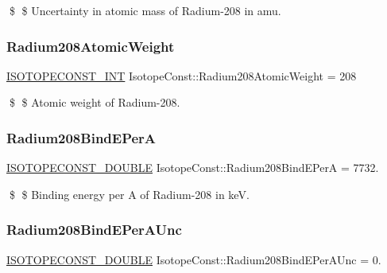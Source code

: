 \$ \$ Uncertainty in atomic mass of Radium-\/208 in amu. \mbox{\label{group___isotope_const-_radium-_ra208_ga771687d5f02faf2dff25a9bd93d7d247}} 
\subsubsection{\texorpdfstring{Radium208\+Atomic\+Weight}{Radium208AtomicWeight}}
{\footnotesize\ttfamily \mbox{\hyperlink{group___isotope_const-_macros_ga5f18360b3e99483a35c32d789e62621c}{I\+S\+O\+T\+O\+P\+E\+C\+O\+N\+S\+T\+\_\+\+I\+NT}} Isotope\+Const\+::\+Radium208\+Atomic\+Weight = 208}

\$ \$ Atomic weight of Radium-\/208. \mbox{\label{group___isotope_const-_radium-_ra208_ga539d3f1468d7b206d43ebeef1cba0013}} 
\subsubsection{\texorpdfstring{Radium208\+Bind\+E\+PerA}{Radium208BindEPerA}}
{\footnotesize\ttfamily \mbox{\hyperlink{group___isotope_const-_macros_ga8f45a7272ce02c0b4c65c44636ed719a}{I\+S\+O\+T\+O\+P\+E\+C\+O\+N\+S\+T\+\_\+\+D\+O\+U\+B\+LE}} Isotope\+Const\+::\+Radium208\+Bind\+E\+PerA = 7732.}

\$ \$ Binding energy per A of Radium-\/208 in keV. \mbox{\label{group___isotope_const-_radium-_ra208_gaf2e5aa4a4822fa90410199182107aabf}} 
\subsubsection{\texorpdfstring{Radium208\+Bind\+E\+Per\+A\+Unc}{Radium208BindEPerAUnc}}
{\footnotesize\ttfamily \mbox{\hyperlink{group___isotope_const-_macros_ga8f45a7272ce02c0b4c65c44636ed719a}{I\+S\+O\+T\+O\+P\+E\+C\+O\+N\+S\+T\+\_\+\+D\+O\+U\+B\+LE}} Isotope\+Const\+::\+Radium208\+Bind\+E\+Per\+A\+Unc = 0.}


